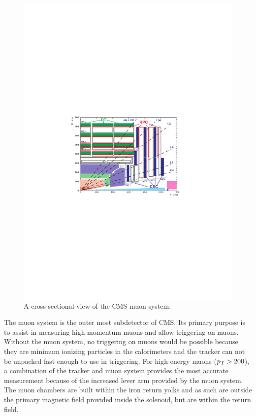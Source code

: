 \begin{figure}[tb]
    \centering
    \includegraphics[width=\textwidth]{figures/muon_layout.pdf}
    \caption{A cross-sectional view of the CMS muon system.}
    \label{fig:muon_layout}
\end{figure}

The muon system is the outer most subdetector of CMS. Its primary purpose is
to assist in measuring high momentum muons and allow triggering on muons.
Without the muon system, no triggering on muons would be possible because they
are minimum ionizing particles in the calorimeters and the tracker can not be
unpacked fast enough to use in triggering. For high energy muons ($p_{\mathrm{T}} > 200$),
a combination of the tracker and muon system provides the most accurate
measurement because of the increased lever arm provided by the muon system. The
muon chambers are built within the iron return yolks and as such are outside
the primary magnetic field provided inside the solenoid, but are within the
return field.

